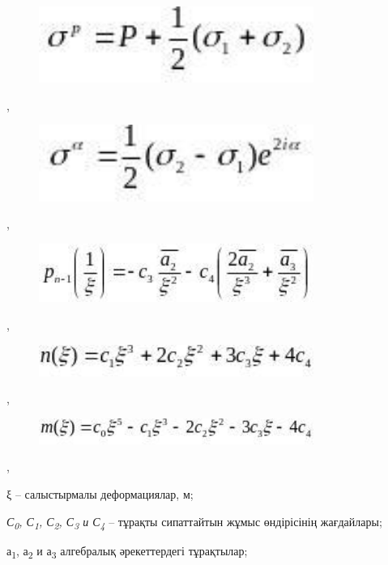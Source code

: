 \begin{figure}[H]
	\centering
	\includegraphics[width=0.8\textwidth]{assets/1289}
	\caption*{}
\end{figure},
\begin{figure}[H]
	\centering
	\includegraphics[width=0.8\textwidth]{assets/1290}
	\caption*{}
\end{figure},
\begin{figure}[H]
	\centering
	\includegraphics[width=0.8\textwidth]{assets/1291}
	\caption*{}
\end{figure},

\begin{figure}[H]
	\centering
	\includegraphics[width=0.8\textwidth]{assets/1292}
	\caption*{}
\end{figure},
\begin{figure}[H]
	\centering
	\includegraphics[width=0.8\textwidth]{assets/1293}
	\caption*{}
\end{figure},

ξ -- салыстырмалы деформациялар, м;

\emph{С\textsubscript{0}, С\textsubscript{1}, С\textsubscript{2},
С\textsubscript{3} и С\textsubscript{4}} -- тұрақты сипаттайтын жұмыс
өндірісінің жағдайлары;

а\textsubscript{1}, а\textsubscript{2} и а\textsubscript{3} алгебралық
әрекеттердегі тұрақтылар;

